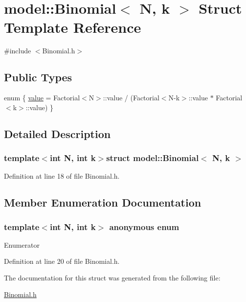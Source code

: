 \hypertarget{structmodel_1_1_binomial}{}\section{model\+:\+:Binomial$<$ N, k $>$ Struct Template Reference}
\label{structmodel_1_1_binomial}


{\ttfamily \#include $<$Binomial.\+h$>$}

\subsection*{Public Types}
\begin{DoxyCompactItemize}
\item 
enum \{ \hyperlink{structmodel_1_1_binomial_a32b0dfb0254231ee66bb9fdf6b5cfe1fa4a7f18d87f0c5f7004715ae0eafb7dfd}{value} = Factorial$<$N$>$\+:\+:value / (Factorial$<$N-\/k$>$\+:\+:value $\ast$ Factorial$<$k$>$\+:\+:value)
 \}
\end{DoxyCompactItemize}


\subsection{Detailed Description}
\subsubsection*{template$<$int N, int k$>$struct model\+::\+Binomial$<$ N, k $>$}



Definition at line 18 of file Binomial.\+h.



\subsection{Member Enumeration Documentation}
\hypertarget{structmodel_1_1_binomial_a32b0dfb0254231ee66bb9fdf6b5cfe1f}{}\subsubsection[{anonymous enum}]{\setlength{\rightskip}{0pt plus 5cm}template$<$int N, int k$>$ anonymous enum}\label{structmodel_1_1_binomial_a32b0dfb0254231ee66bb9fdf6b5cfe1f}
\begin{Desc}
\item[Enumerator]\par
\begin{description}
\item[{\em 
\hypertarget{structmodel_1_1_binomial_a32b0dfb0254231ee66bb9fdf6b5cfe1fa4a7f18d87f0c5f7004715ae0eafb7dfd}{}value\label{structmodel_1_1_binomial_a32b0dfb0254231ee66bb9fdf6b5cfe1fa4a7f18d87f0c5f7004715ae0eafb7dfd}
}]\end{description}
\end{Desc}


Definition at line 20 of file Binomial.\+h.



The documentation for this struct was generated from the following file\+:\begin{DoxyCompactItemize}
\item 
\hyperlink{_binomial_8h}{Binomial.\+h}\end{DoxyCompactItemize}
